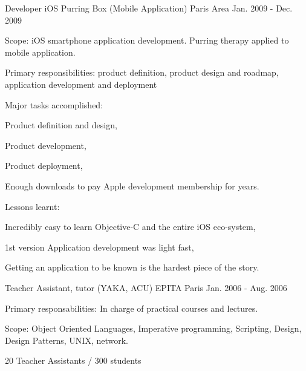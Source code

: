 \begin{cventries}
  \cventry
    {Developer iOS} %
    {Purring Box (Mobile Application)} %
    {Paris Area} %
    {Jan. 2009 - Dec. 2009} %
    {
      \begin{cvitems} %
        \item {Scope: iOS smartphone application development. Purring therapy applied to mobile application.}
        \item {Primary responsibilities: product definition, product design and roadmap, application development and deployment}
        \item {Major tasks accomplished:}
        \begin{cvsubitems}
          \item {Product definition and design,}
          \item {Product development,}
          \item {Product deployment,}
          \item {Enough downloads to pay Apple development membership for years.}
        \end{cvsubitems}
        \item {Lessons learnt:}
        \begin{cvsubitems}
          \item {Incredibly easy to learn Objective-C and the entire iOS eco-system,}
          \item {1st version Application development was light fast,}
          \item {Getting an application to be known is the hardest piece of the story.}
        \end{cvsubitems}
      \end{cvitems}
    }

  \cventry
    {Teacher Assistant, tutor (YAKA, ACU)} %
    {EPITA} %
    {Paris} %
    {Jan. 2006 - Aug. 2006} %
    {
      \begin{cvitems} %
        \item {Primary responsabilities: In charge of practical courses and lectures.}
        \item {Scope: Object Oriented Languages, Imperative programming, Scripting, Design, Design Patterns, UNIX, network.}
        \item {20 Teacher Assistants / 300 students}
      \end{cvitems}
    }


\end{cventries}
